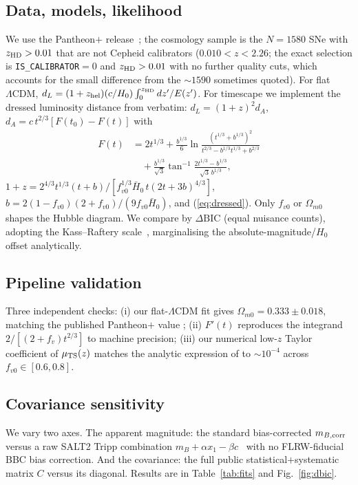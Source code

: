 \documentclass[aps,prd,twocolumn,nofootinbib,superscriptaddress,floatfix]{revtex4-2}
\newcommand{\Ho}{H_{0}}
\newcommand{\Hbaro}{\bar H_{0}}
\newcommand{\fvo}{f_{v0}}
\newcommand{\Lcdm}{\Lambda\mathrm{CDM}}
\newcommand{\dBIC}{\Delta\mathrm{BIC}}
\begin{document}
\subsection{Data, models, likelihood}
We use the Pantheon$+$ release~\cite{Scolnic2022,Brout2022}; the cosmology
sample is the $N=1580$ SNe with $z_{\rm HD}>0.01$ that are not Cepheid
calibrators ($0.010<z<2.26$; the exact selection is \texttt{IS\_CALIBRATOR}${}=0$ and
$z_{\rm HD}>0.01$ with no further quality cuts, which accounts for the small difference
from the $\sim\!1590$ sometimes quoted). For flat $\Lcdm$,
$d_L=(1+z_{\rm hel})(c/\Ho)\int_0^{z_{\rm HD}}dz'/E(z')$. For timescape we
implement the dressed luminosity distance from \cite[App.~A]{Dam2017} verbatim:
$d_L=(1+z)^2d_A$, $d_A=c\,t^{2/3}[F(t_0)-F(t)]$ with
\begin{align}
F(t)&=2t^{1/3}+\frac{b^{1/3}}{6}\ln\frac{(t^{1/3}+b^{1/3})^2}
     {t^{2/3}-b^{1/3}t^{1/3}+b^{2/3}}\nonumber\\
   &\quad+\frac{b^{1/3}}{\sqrt3}\tan^{-1}\frac{2t^{1/3}-b^{1/3}}{\sqrt3\,b^{1/3}},
\end{align}
$1+z=2^{4/3}t^{1/3}(t+b)/[\fvo^{1/3}\Hbaro\,t(2t+3b)^{4/3}]$,
$b=2(1-\fvo)(2+\fvo)/(9\fvo\Hbaro)$, and (\ref{eq:dressed}). Only $\fvo$ or
$\Omega_{m0}$ shapes the Hubble diagram. We compare by $\dBIC$ (equal nuisance
counts), adopting the Kass--Raftery scale~\cite{KassRaftery1995}, marginalising
the absolute-magnitude/$\Ho$ offset analytically.

\subsection{Pipeline validation}
Three independent checks: (i) our flat-$\Lcdm$ fit gives
$\Omega_{m0}=0.333\pm0.018$, matching the published Pantheon$+$ value
\cite{Brout2022}; (ii) $F'(t)$ reproduces the integrand
$2/[(2+f_v)t^{2/3}]$ to machine precision; (iii) our numerical low-$z$ Taylor
coefficient of $\mu_{\rm TS}(z)$ matches the analytic expression of
\cite{Dam2017} to $\sim\!10^{-4}$ across $\fvo\in[0.6,0.8]$.

\subsection{Covariance sensitivity}
We vary two axes. The apparent magnitude: the standard bias-corrected
$m_{B,\rm corr}$ versus a raw SALT2 Tripp combination
$m_B+\alpha x_1-\beta c$~\cite{Tripp1998} with no FLRW-fiducial BBC bias
correction. And the covariance: the full public statistical$+$systematic
matrix $C$ versus its diagonal. Results are in Table~\ref{tab:fits} and
Fig.~\ref{fig:dbic}.
\end{document}
